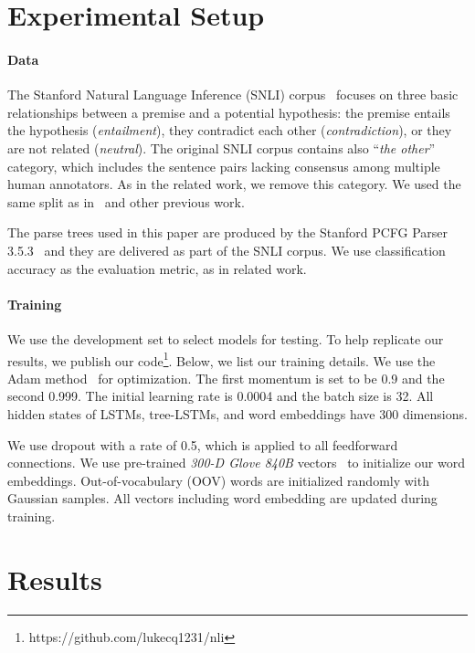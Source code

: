 \documentclass[11pt,a4paper]{article}
\begin{document}
\section{Experimental Setup}
\label{sec:set}

\paragraph{Data}

The Stanford Natural Language Inference (SNLI) corpus~\citep{Bowman:D15-1075} focuses on three basic relationships between a premise and a potential hypothesis: the premise entails the hypothesis (\textit{entailment}), they contradict each other (\textit{contradiction}), or they are not related (\textit{neutral}). The original SNLI corpus contains also ``\textit{the other}'' category, which includes the sentence pairs lacking consensus among multiple human annotators. As in the related work, we remove this category. 
We used the same split as in~\citet{Bowman:D15-1075} and other previous work. 

The parse trees used in this paper are produced by the Stanford PCFG Parser 3.5.3~\citep{Klein:P03-1054} and they are delivered as part of the SNLI corpus. We use classification accuracy as the evaluation metric, as in related work.

\paragraph{Training}
We use the development set to select models for testing. To help replicate our results, we publish our code\footnote{https://github.com/lukecq1231/nli}. Below, we list our training details. We use the Adam method~\citep{DBLP:journals/corr/KingmaB14} for optimization. The first momentum is set to be 0.9 and the second 0.999. The initial learning rate is 0.0004 and the batch size is 32. All hidden states of LSTMs, tree-LSTMs, and word embeddings have 300 dimensions.

We use dropout with a rate of 0.5, which is applied to all feedforward connections. We use pre-trained \textit{300-D Glove 840B} vectors~\citep{Pennington:D14-1162} to initialize our word embeddings. Out-of-vocabulary (OOV) words are initialized randomly with Gaussian samples. All vectors including word embedding are updated during training. 

\section{Results}
\end{document}
